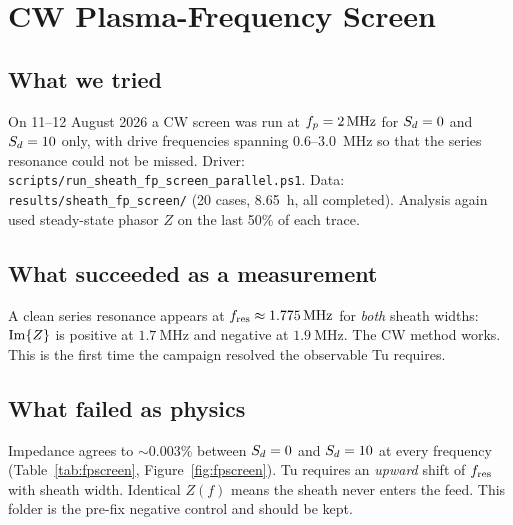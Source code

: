 \chapter{CW Plasma-Frequency Screen}
\label{ch:fpscreen}

\section{What we tried}

On 11--12 August 2026 a CW screen was run at \(f_p=\SI{2}{\mega\hertz}\) for \(S_d=0\) and \(S_d=10\) only, with drive frequencies spanning 0.6--3.0~MHz so that the series resonance could not be missed. Driver: \texttt{scripts/run\_sheath\_fp\_screen\_parallel.ps1}. Data: \texttt{results/sheath\_fp\_screen/} (20 cases, 8.65~h, all completed). Analysis again used steady-state phasor \(Z\) on the last 50\% of each trace.

\section{What succeeded as a measurement}

A clean series resonance appears at \(f_{\mathrm{res}}\approx\SI{1.775}{\mega\hertz}\) for \emph{both} sheath widths: \(\operatorname{Im}\{Z\}\) is positive at \(\SI{1.7}{\mega\hertz}\) and negative at \(\SI{1.9}{\mega\hertz}\). The CW method works. This is the first time the campaign resolved the observable Tu requires.

\section{What failed as physics}

Impedance agrees to \(\sim 0.003\%\) between \(S_d=0\) and \(S_d=10\) at every frequency (Table~\ref{tab:fpscreen}, Figure~\ref{fig:fpscreen}). Tu requires an \emph{upward} shift of \(f_{\mathrm{res}}\) with sheath width. Identical \(Z(f)\) means the sheath never enters the feed. This folder is the pre-fix negative control and should be kept.

